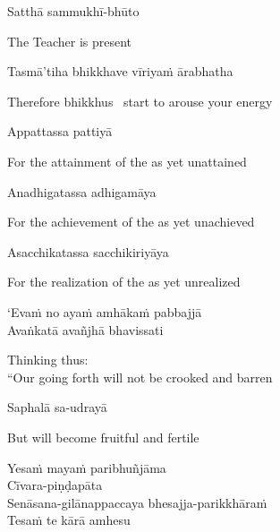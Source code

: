 Satthā sammukhī-bhūto

\begin{english}
  The Teacher is present
\end{english}

Tasmā'tiha bhikkhave vīriyaṁ ārabhatha

\begin{english}
  Therefore bhikkhus \breathmark\ start to arouse your energy
\end{english}

Appattassa pattiyā

\begin{english}
  For the attainment of the as yet unattained
\end{english}

Anadhigatassa adhigamāya

\begin{english}
  For the achievement of the as yet unachieved
\end{english}

Asacchikatassa sacchikiriyāya

\begin{english}
  For the realization of the as yet unrealized
\end{english}

`Evaṁ no ayaṁ amhākaṁ pabbajjā\\
Avaṅkatā avañjhā\makeatletter\hyperlink{endnote90-appendix}\makeatother
bhavissati

\begin{english}
  Thinking thus:\\
  ``Our going forth will not be crooked and barren\makeatletter\hyperlink{endnote91-appendix}\makeatother
\end{english}

Saphalā sa-udrayā

\begin{english}
  But will become fruitful and fertile
\end{english}

Yesaṁ mayaṁ paribhuñjāma\\
Cīvara-piṇḍapāta\\
Senāsana-gilānappaccaya bhesajja-parikkhāraṁ\\
Tesaṁ te kārā amhesu

